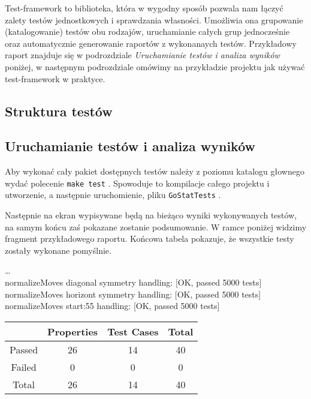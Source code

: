 \documentclass[10pt,leqno]{article}
\newcommand{\cmd}[1]{
  \texttt{#1}
}
\begin{document}
Test-framework to biblioteka, która w wygodny sposób pozwala nam łączyć zalety testów 
jednostkowych i sprawdzania własności. Umożliwia ona grupowanie (katalogowanie) testów 
obu rodzajów, uruchamianie całych grup jednocześnie oraz automatycznie generowanie
raportów z wykonanaych testów. Przykładowy raport znajduje się w podrozdziale 
\emph{Uruchamianie testów i analiza wyników} poniżej, w następnym podrozdziale omówimy
na przykładzie projektu jak używać test-framework w praktyce.

\subsection{Struktura testów}

\subsection{Uruchamianie testów i analiza wyników}

Aby wykonać cały pakiet dostępnych testów należy z poziomu katalogu głownego wydać polecenie \cmd{make test}.
Spowoduje to kompilacje całego projektu i utworzenie, a następnie uruchomienie, pliku \cmd{GoStatTests}.

Następnie na ekran wypisywane będą na bieżąco wyniki wykonywanych testów, na samym końcu zaś pokazane zostanie
podsumowanie. W ramce poniżej widzimy fragment przykładowego raportu. Końcowa tabela pokazuje, że wszystkie
testy zostały wykonane pomyślnie.

\begin{framed}
  \noindent \dots \\
  normalizeMoves diagonal symmetry handling: [OK, passed 5000 tests] \\ 
  normalizeMoves horizont symmetry handling: [OK, passed 5000 tests] \\
  normalizeMoves start:55 handling: [OK, passed 5000 tests] \\

\renewcommand{\arraystretch}{1.5}
\begin{tabular}{| c | c | c | c | } \hline
         & Properties &  Test Cases &  Total        \\ \hline
 Passed  & 26         &  14         &  40           \\ \hline
 Failed  & 0          &  0          &  0            \\ \hline
 Total   & 26         &  14         &  40           \\ \hline
\end{tabular}
\end{framed}
\end{document}
